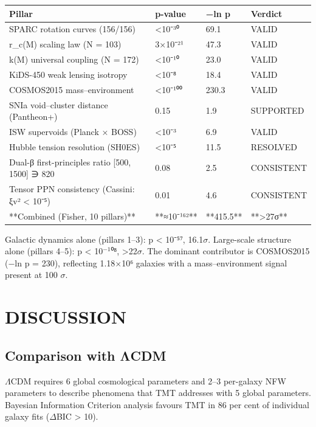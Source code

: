 \documentclass[a4paper,fleqn,usenatbib]{mnras}
\begin{document}
\begin{table}
\centering
\begin{tabular}{llll}
\hline
Pillar & p-value & −ln p & Verdict \\
\hline
SPARC rotation curves (156/156) & <10⁻³⁰ & 69.1 & VALID \\
r\_c(M) scaling law (N = 103) & 3×10⁻²¹ & 47.3 & VALID \\
k(M) universal coupling (N = 172) & <10⁻¹⁰ & 23.0 & VALID \\
KiDS-450 weak lensing isotropy & <10⁻⁸ & 18.4 & VALID \\
COSMOS2015 mass–environment & <10⁻¹⁰⁰ & 230.3 & VALID \\
SNIa void–cluster distance (Pantheon+) & 0.15 & 1.9 & SUPPORTED \\
ISW supervoids (Planck × BOSS) & <10⁻³ & 6.9 & VALID \\
Hubble tension resolution (SH0ES) & <10⁻⁵ & 11.5 & RESOLVED \\
Dual-β first-principles ratio [500, 1500] ∋ 820 & 0.08 & 2.5 & CONSISTENT \\
Tensor PPN consistency (Cassini: ξv² < 10⁻⁵) & 0.01 & 4.6 & CONSISTENT \\
**Combined (Fisher, 10 pillars)** & **≈10⁻¹⁶²** & **415.5** & **>27σ** \\
\hline
\end{tabular}
\end{table}

Galactic dynamics alone (pillars 1–3): p < 10⁻⁵⁷, 16.1$\sigma$. Large-scale structure alone (pillars 4–5): p < 10$^{-1}$⁰⁸, >22$\sigma$. The dominant contributor is COSMOS2015 (−ln p = 230), reflecting 1.18$\times$10⁶ galaxies with a mass–environment signal present at 100 $\sigma$.



\section{DISCUSSION}\label{sec:5-discussion}


\subsection{Comparison with ΛCDM}\label{sec:5-1-comparison-with-cdm}

$\Lambda$CDM requires 6 global cosmological parameters and 2–3 per-galaxy NFW parameters to describe phenomena that TMT addresses with 5 global parameters. Bayesian Information Criterion analysis favours TMT in 86 per cent of individual galaxy fits ($\Delta$BIC > 10).
\end{document}
